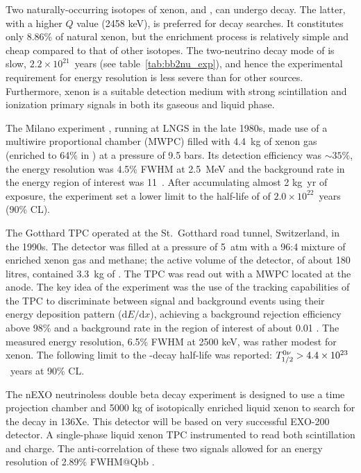Two naturally-occurring isotopes of xenon,  and , can undergo \bb decay. The latter, with a higher $Q$ value (2458 keV), is preferred for \bbonu decay searches. It constitutes only 8.86\% of natural xenon, but the enrichment process is relatively simple and cheap compared to that of other \bb isotopes. The two-neutrino decay mode of  is slow, $2.2\times10^{21}$~years (see table~\ref{tab:bb2nu_exp}), and hence the experimental requirement for energy resolution is less severe than for other \bb sources. Furthermore, xenon is a suitable detection medium with strong scintillation and ionization primary signals in both its gaseous and liquid phase.

The Milano experiment \cite{Zanotti:1991vh}, running at LNGS in the late 1980s, made use of a multiwire proportional chamber (MWPC) filled with 4.4~kg of xenon gas (enriched to 64\% in ) at a pressure of 9.5 bars. Its detection efficiency was $\sim35\%$, the energy resolution was 4.5\% FWHM at 2.5~MeV and the background rate in the energy region of interest was 11~\ckky. After accumulating almost 2 kg~yr of exposure, the experiment set a lower limit to the half-life of  of $2.0\times10^{22}$~years (90\% CL).

The Gotthard TPC \cite{Luscher:1998sd, Vuilleumier:1993zm} operated at the St.\ Gotthard road tunnel, Switzerland, in the 1990s. The detector was filled at a pressure of 5~atm with a 96:4 mixture of enriched xenon gas and methane; the active volume of the detector, of about 180 litres, contained 3.3~kg of . The TPC was read out with a MWPC located at the anode. The key idea of the experiment was the use of the tracking capabilities of the TPC to discriminate between signal and background events using their energy deposition pattern ($\mathrm{d}E/\mathrm{d}x$), achieving a background rejection efficiency above 98\% and a background rate in the region of interest of about 0.01 \ckkbby. The measured energy resolution, 6.5\% FWHM at 2500 keV, was rather modest for xenon. The following limit to the  \bbonu-decay half-life was reported: $T^{0\nu}_{1/2} > 4.4\times10^{23}$~years at 90\% CL.


The nEXO neutrinoless double beta decay experiment is designed to use a time projection chamber and 5000 kg of isotopically enriched liquid xenon to search for the decay in 136Xe. This detector will be based on very successful EXO-200 detector. A single-phase liquid xenon TPC instrumented to read both scintillation and charge. The anti-correlation of these two signals allowed for an energy resolution of 2.89\% FWHM@Qbb \cite{EXO-200:2020wmu}.

